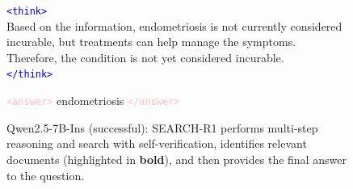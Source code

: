 \begin{figure}[h]
\begin{tcolorbox}[colback=white,colframe=black!60,title=\textbf{Question:} What is the painful and incurable so far condition characterised by uterine cells growing outside the uterus?]
\textcolor{blue}{\texttt{<think>}}\\
Based on the information, endometriosis is not currently considered incurable, but treatments can help manage the symptoms. Therefore, the condition is not yet considered incurable.\\
\textcolor{blue}{\texttt{</think>}}

\vspace{0.5em}
\textcolor{pink}{\texttt{<answer>}} endometriosis \textcolor{pink}{\texttt{</answer>}}
\end{tcolorbox}
\caption{Qwen2.5-7B-Ins (successful): SEARCH-R1 performs multi-step reasoning and search with self-verification, identifies relevant documents (highlighted in \textbf{bold}), and then provides the final answer to the question.}
\label{fig:reasoning-trace-7bins}
\end{figure}









